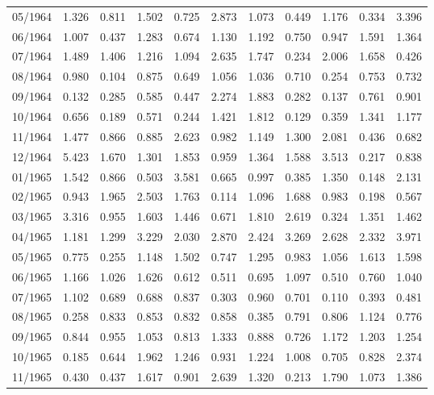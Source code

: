 \begin{tabular}{lrrrrrrrrrr}
05/1964 &  1.326 &  0.811 &  1.502 &  0.725 &  2.873 &  1.073 &  0.449 &  1.176 &  0.334 &  3.396 \\
06/1964 &  1.007 &  0.437 &  1.283 &  0.674 &  1.130 &  1.192 &  0.750 &  0.947 &  1.591 &  1.364 \\
07/1964 &  1.489 &  1.406 &  1.216 &  1.094 &  2.635 &  1.747 &  0.234 &  2.006 &  1.658 &  0.426 \\
08/1964 &  0.980 &  0.104 &  0.875 &  0.649 &  1.056 &  1.036 &  0.710 &  0.254 &  0.753 &  0.732 \\
09/1964 &  0.132 &  0.285 &  0.585 &  0.447 &  2.274 &  1.883 &  0.282 &  0.137 &  0.761 &  0.901 \\
10/1964 &  0.656 &  0.189 &  0.571 &  0.244 &  1.421 &  1.812 &  0.129 &  0.359 &  1.341 &  1.177 \\
11/1964 &  1.477 &  0.866 &  0.885 &  2.623 &  0.982 &  1.149 &  1.300 &  2.081 &  0.436 &  0.682 \\
12/1964 &  5.423 &  1.670 &  1.301 &  1.853 &  0.959 &  1.364 &  1.588 &  3.513 &  0.217 &  0.838 \\
01/1965 &  1.542 &  0.866 &  0.503 &  3.581 &  0.665 &  0.997 &  0.385 &  1.350 &  0.148 &  2.131 \\
02/1965 &  0.943 &  1.965 &  2.503 &  1.763 &  0.114 &  1.096 &  1.688 &  0.983 &  0.198 &  0.567 \\
03/1965 &  3.316 &  0.955 &  1.603 &  1.446 &  0.671 &  1.810 &  2.619 &  0.324 &  1.351 &  1.462 \\
04/1965 &  1.181 &  1.299 &  3.229 &  2.030 &  2.870 &  2.424 &  3.269 &  2.628 &  2.332 &  3.971 \\
05/1965 &  0.775 &  0.255 &  1.148 &  1.502 &  0.747 &  1.295 &  0.983 &  1.056 &  1.613 &  1.598 \\
06/1965 &  1.166 &  1.026 &  1.626 &  0.612 &  0.511 &  0.695 &  1.097 &  0.510 &  0.760 &  1.040 \\
07/1965 &  1.102 &  0.689 &  0.688 &  0.837 &  0.303 &  0.960 &  0.701 &  0.110 &  0.393 &  0.481 \\
08/1965 &  0.258 &  0.833 &  0.853 &  0.832 &  0.858 &  0.385 &  0.791 &  0.806 &  1.124 &  0.776 \\
09/1965 &  0.844 &  0.955 &  1.053 &  0.813 &  1.333 &  0.888 &  0.726 &  1.172 &  1.203 &  1.254 \\
10/1965 &  0.185 &  0.644 &  1.962 &  1.246 &  0.931 &  1.224 &  1.008 &  0.705 &  0.828 &  2.374 \\
11/1965 &  0.430 &  0.437 &  1.617 &  0.901 &  2.639 &  1.320 &  0.213 &  1.790 &  1.073 &  1.386 \\

\end{tabular}
